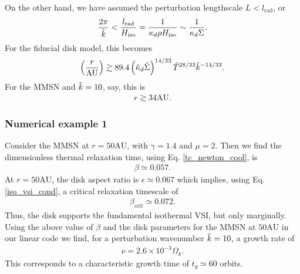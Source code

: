 On the other hand, we have assumed the perturbation lengthscale
$L<l_\mathrm{rad}$, or
\begin{align} 
  \frac{2\pi}{\hat{k}} < \frac{l_\mathrm{rad}}{H_\mathrm{iso}} =
  \frac{1}{\kappa_d\rho H_\mathrm{iso}} \sim
  \frac{1}{\kappa_d\Sigma}. 
\end{align}
For the fiducial disk model, this becomes 
\begin{align}
  \left(\frac{r}{\mathrm{AU}}\right) \gtrsim 
  89.4\left(\hat{\kappa}_d\hat{\Sigma}\right)^{14/33}\hat{T}^{28/33}\hat{k}^{-14/33}.  
\end{align}
For the MMSN and $\hat{k}=10$, say, this is
\begin{align*}
  r \gtrsim 34 \mathrm{AU}. 
\end{align*}

\subsubsection{Numerical example 1}
Consider the MMSN at $r=50\mathrm{AU}$, with $\gamma=1.4$ and
$\mu=2$. Then we find
the dimensionless thermal relaxation time, using
Eq. \ref{tc_newton_cool}, is
\begin{align*}
  \beta \simeq 0.057. 
\end{align*}
At $r=50\mathrm{AU}$, the disk aspect ratio is $\epsilon \simeq
0.067$ which implies, using Eq. \ref{iso_vsi_cond}, a critical 
relaxation timescale of  
\begin{align*}
  \beta_\mathrm{crit} \simeq 0.072. 
\end{align*}
Thus, the disk supports the fundamental isothermal VSI, but only
marginally. Using the above value of $\beta$ and the disk parameters
for the MMSN at $50\mathrm{AU}$ in our linear code we find, for a
perturbation wavenumber $\hat{k}=10$, a growth rate of
\begin{align*}
  \nu = 2.6\times10^{-3}\Omega_k.
\end{align*}
This corresponds to a characteristic growth time of $t_g\simeq 60$
orbits. 

